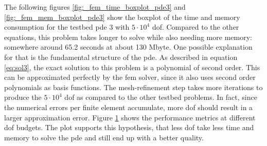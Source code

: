 \documentclass[./\jobname.tex]{subfiles}
\begin{document}
The following figures \ref{fig:_fem_time_boxplot_pde3} and \ref{fig:_fem_mem_boxplot_pde3} show the boxplot of the time and memory consumption for the testbed \gls{pde} 3 with $5 \cdot 10^4$ \gls{dof}. Compared to the other equations, this problem takes longer to solve while also needing more memory: somewhere around 65.2 seconds at about 130 Mbyte. One possible explanation for that is the fundamental structure of the \gls{pde}. As described in equation \eqref{eq:sol3}, the exact solution to this problem is a polynomial of second order. This can be approximated perfectly by the \gls{fem} solver, since it also uses second order polynomials as basis functions. The mesh-refinement step takes more iterations to produce the $5 \cdot 10^4$ \gls{dof} as compared to the other testbed problems. In fact, since the numerical errors per finite element accumulate, more \gls{dof} should result in a larger approximation error. Figure \ref{fig:_dof_sweep_pde3} shows the performance metrics at different \gls{dof} budgets. The plot supports this hypothesis, that less \gls{dof} take less time and memory to solve the \gls{pde} and still end up with a better quality. 

\begin{figure}[H]
	\centering
	\noindent{}
	\label{fig:_dof_sweep_pde3}
\end{figure}
\end{document}
